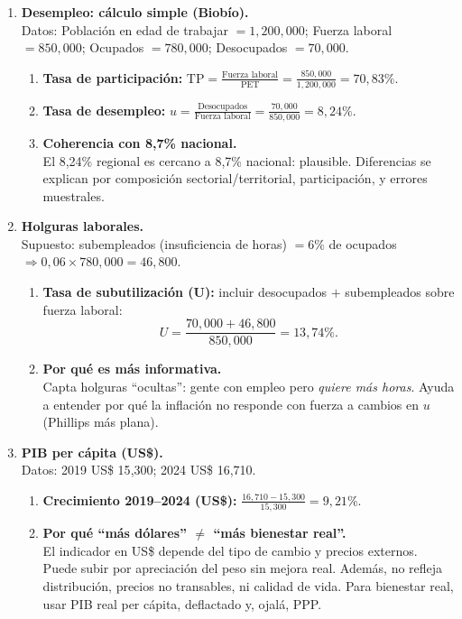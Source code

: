 \documentclass[11pt,addpoints]{article}
\begin{document}
\begin{enumerate}
\item \textbf{Desempleo: cálculo simple (Biobío).} \\
Datos: Población en edad de trabajar $=1{,}200{,}000$; Fuerza laboral $=850{,}000$; Ocupados $=780{,}000$; Desocupados $=70{,}000$.
\begin{enumerate}[label=(\alph*)]
\item \textbf{Tasa de participación:} $\displaystyle \text{TP}=\frac{\text{Fuerza laboral}}{\text{PET}}=\frac{850{,}000}{1{,}200{,}000}=70{,}83\%$.
\item \textbf{Tasa de desempleo:} $\displaystyle u=\frac{\text{Desocupados}}{\text{Fuerza laboral}}=\frac{70{,}000}{850{,}000}=8{,}24\%$.
\newpage %
\vspace*{0.1cm} %
\item \textbf{Coherencia con 8,7\% nacional.} \\
El 8,24\% regional es cercano a 8,7\% nacional: plausible. Diferencias se explican por composición sectorial/territorial, participación, y errores muestrales.
\end{enumerate}

\item \textbf{Holguras laborales.} \\
Supuesto: subempleados (insuficiencia de horas) $=6\%$ de ocupados $\Rightarrow 0{,}06\times 780{,}000=46{,}800$.
\begin{enumerate}[label=(\alph*)]
\item \textbf{Tasa de subutilización (U):} incluir desocupados $+$ subempleados sobre fuerza laboral:
\[
U=\frac{70{,}000+46{,}800}{850{,}000}=13{,}74\%.
\]
\item \textbf{Por qué es más informativa.} \\
Capta holguras “ocultas”: gente con empleo pero \emph{quiere más horas}. Ayuda a entender por qué la inflación no responde con fuerza a cambios en $u$ (Phillips más plana).
\end{enumerate}

\item \textbf{PIB per cápita (US\$).} \\
Datos: 2019 US\$ 15{,}300; 2024 US\$ 16{,}710.
\begin{enumerate}[label=(\alph*)]
\item \textbf{Crecimiento 2019–2024 (US\$):} $\displaystyle \frac{16{,}710-15{,}300}{15{,}300}=9{,}21\%$.
\item \textbf{Por qué “más dólares” $\neq$ “más bienestar real”.} \\
El indicador en US\$ depende del tipo de cambio y precios externos. Puede subir por apreciación del peso sin mejora real. Además, no refleja distribución, precios no transables, ni calidad de vida. Para bienestar real, usar PIB real per cápita, deflactado y, ojalá, PPP.
\end{enumerate}


\end{enumerate}
\end{document}
